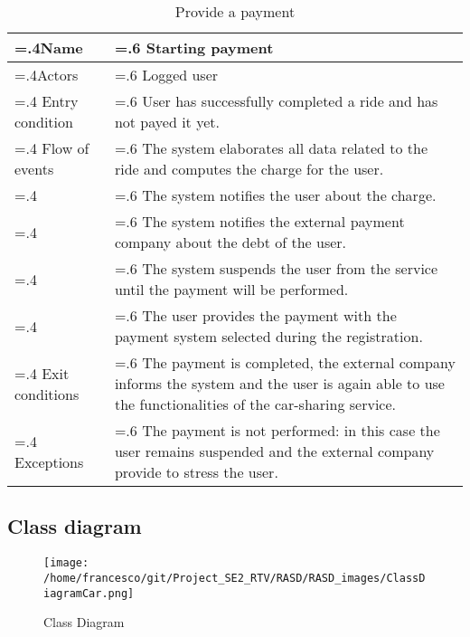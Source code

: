 \documentclass[10pt, a4paper,titlepage]{article}
\begin{document}
\begin{table}[!t]
\caption{Provide a payment} \label{tab:scenario13}
\begin{tabularx}{\textwidth}{|>{\hsize=.4\hsize}X|>{\hsize=.6\hsize}X|}
\hline
Name & Starting payment\\
\hline
Actors & Logged user\\ 
\hline
Entry condition & User has successfully completed a ride and has not payed it yet.\\
\hline
Flow of events & The system elaborates all data related to the ride and computes the charge for the user.\\ 
& The system notifies the user about the charge.\\
& The system notifies the external payment company about the debt of the user.\\
& The system suspends the user from the service until the payment will be performed.\\
& The user provides the payment with the payment system selected during the registration.\\
\hline
Exit conditions & The payment is completed, the external company informs the system and the user is again able to use the functionalities of the car-sharing service.\\
\hline
Exceptions & The payment is not performed: in this case the user remains suspended and the external company provide to stress the user.\\
\hline
\end{tabularx}
\end{table}
\clearpage
\subsection{Class diagram}
\begin{figure}[!h]
\texttt{[image: /home/francesco/git/Project\_SE2\_RTV/RASD/RASD\_images/ClassDiagramCar.png]}
\caption{Class Diagram}
\label{fig:Class Diagram}
\end{figure}
\clearpage
\end{document}
